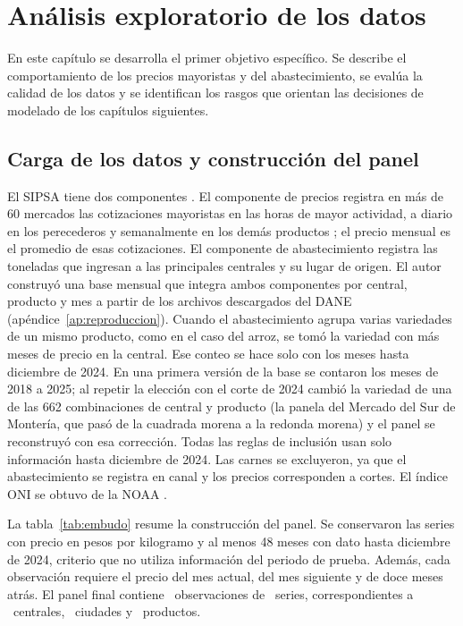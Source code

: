 \chapter{Análisis exploratorio de los datos}
\label{cap:eda}

En este capítulo se desarrolla el primer objetivo específico. Se describe el comportamiento de los precios mayoristas y del abastecimiento, se evalúa la calidad de los datos y se identifican los rasgos que orientan las decisiones de modelado de los capítulos siguientes.

\section{Carga de los datos y construcción del panel}
\label{sec:carga}

El SIPSA tiene dos componentes \citep{dane}. El componente de precios registra en más de 60 mercados las cotizaciones mayoristas en las horas de mayor actividad, a diario en los perecederos y semanalmente en los demás productos \citep{danefme2022}; el precio mensual es el promedio de esas cotizaciones. El componente de abastecimiento registra las toneladas que ingresan a las principales centrales y su lugar de origen. El autor construyó una base mensual que integra ambos componentes por central, producto y mes a partir de los archivos descargados del DANE (apéndice~\ref{ap:reproduccion}). Cuando el abastecimiento agrupa varias variedades de un mismo producto, como en el caso del arroz, se tomó la variedad con más meses de precio en la central. Ese conteo se hace solo con los meses hasta diciembre de 2024. En una primera versión de la base se contaron los meses de 2018 a 2025; al repetir la elección con el corte de 2024 cambió la variedad de una de las 662 combinaciones de central y producto (la panela del Mercado del Sur de Montería, que pasó de la cuadrada morena a la redonda morena) y el panel se reconstruyó con esa corrección. Todas las reglas de inclusión usan solo información hasta diciembre de 2024. Las carnes se excluyeron, ya que el abastecimiento se registra en canal y los precios corresponden a cortes. El índice ONI se obtuvo de la NOAA \citep{noaa}.

La tabla~\ref{tab:embudo} resume la construcción del panel. Se conservaron las series con precio en pesos por kilogramo y al menos 48 meses con dato hasta diciembre de 2024, criterio que no utiliza información del periodo de prueba. Además, cada observación requiere el precio del mes actual, del mes siguiente y de doce meses atrás. El panel final contiene \cfilas\ observaciones de \cseries\ series, correspondientes a \ccentrales\ centrales, \cciudades\ ciudades y \calimentos\ productos.

